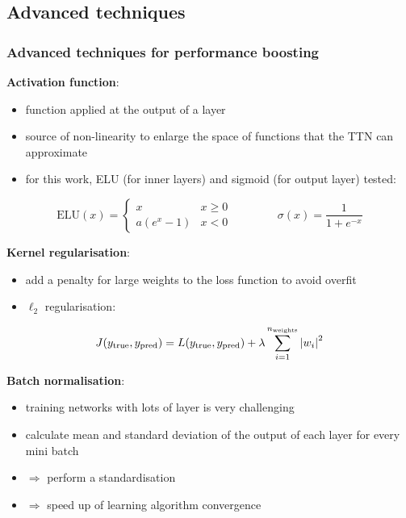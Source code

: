 \documentclass[xcolor=table,8pt]{beamer}
\begin{document}
    \subsection{Advanced techniques}
    \begin{frame}[t]
        \frametitle{Advanced techniques for performance boosting}
        
        \textbf{Activation function}:
        \begin{itemize}
            \item function applied at the output of a layer
            \item source of non-linearity to enlarge the space of functions that the TTN can approximate
            \item for this work, \alert{ELU} (for inner layers) and \alert{sigmoid} (for output layer) tested:
        \end{itemize}
        \begin{equation}
            \text{ELU}(x)
            =
            \begin{cases}
                x   &   x \ge 0 \\
                a(e^{x}-1)  &   x < 0
            \end{cases}
            \qquad\qquad
            \sigma(x)
            =
            \frac{1}{1 + e^{-x}}
        \end{equation}
        
        \medskip
        \textbf{Kernel regularisation}:
        \begin{itemize}
            \item add a penalty for large weights to the loss function to avoid overfit
            \item \alert{\( \ell_{2} \) regularisation}:
        \end{itemize}
        \begin{equation}
            J(y_{\text{true}}, y_{\text{pred}})
            =
            L(y_{\text{true}}, y_{\text{pred}})
            +
            \lambda \sum_{i=1}^{n_{\text{weights}}} \abs{w_{i}}^{2}
        \end{equation}
        
        \medskip
        \textbf{Batch normalisation}:
        \begin{itemize}
            \item training networks with lots of layer is very challenging
            \item calculate mean and standard deviation of the output of each layer for every mini batch
            \item \( \Rightarrow \) perform a \alert{standardisation}
            \item \( \Rightarrow \) \alert{speed up of learning algorithm convergence}
        \end{itemize}
    \end{frame}
    
\end{document}
